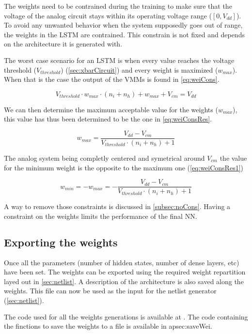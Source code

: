 The weights need to be contrained during the training to make sure that the voltage of the analog circuit stays within its operating voltage range ($[0,V_{dd}]$). To avoid any unwanted behavior when the system supposedly goes out of range, the weights in the \ac{LSTM} are contrained. This constrain is not fixed and depends on the architecture it is generated with.

The worst case scenario for an \ac{LSTM} is when every value reaches the voltage threshold ($V_{threshold}$) (\cref{sec:xbarCircuit}) and every weight is maximized ($w_{max}$). When that is the case the output of the \acp{VMM} is found in \cref{eq:weiCons}.

\begin{equation}\label{eq:weiCons}
  V_{threshold}\cdot w_{max} \cdot(n_i+n_h)+w_{max}+V_{cm}= V_{dd}
\end{equation}

We can then determine the maximum acceptable value for the weights ($w_{max}$), this value has thus been determined to be the one in \cref{eq:weiConsRes}.

\begin{equation}\label{eq:weiConsRes}
  w_{max}=\frac{V_{dd}-V_{cm}}{V_{threshold}\cdot(n_i+n_h)+1}
\end{equation}

The analog system being completly centered and symetrical around $V_{cm}$ the value for the minimum weight is the opposite to the maximum one (\cref{eq:weiConsRes1})

\begin{equation}\label{eq:weiConsRes1}
  w_{min}=-w_{max}=-\frac{V_{dd}-V_{cm}}{V_{threshold}\cdot(n_i+n_h)+1}
\end{equation}

A way to remove those constraints is discussed in \cref{subsec:noCons}. Having a constraint on the weights limits the performance of the final \ac{NN}.

\subsection{Exporting the weights}

Once all the parameters (number of hidden states, number of dense layers, etc) have been set. The weights can be exported using the required weight repartition layed out in \cref{sec:netlist}. A description of the architecture is also saved along the weights. This file can now be used as the input for the netlist generator (\cref{sec:netlist}).

The code used for all the weights generations is available at \cite{lstmWei}. The code containing the finctions to save the weights to a file is available in \ac{apsec:saveWei}.

